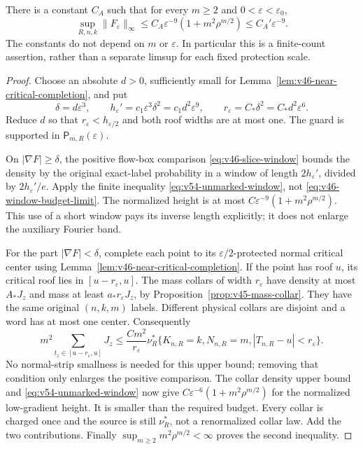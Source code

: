 \begin{proposition}
\label{prop:v54-protected-height}
There is a constant $C_A$ such that for every $m\ge2$ and
$0<\varepsilon<\varepsilon_0$,
\begin{equation}\label{eq:v54-protected-height}
 \sup_{R,n,k}\|F_\varepsilon\|_\infty
 \le C_A\varepsilon^{-9}(1+m^2\rho^{m/2})
 \le C_A'\varepsilon^{-9}.
\end{equation}
The constants do not depend on $m$ or $\varepsilon$. In particular
this is a finite-count assertion, rather than a separate limsup
for each fixed protection scale.
\end{proposition}
\begin{proof}
Choose an absolute $d>0$, sufficiently small for
Lemma~\ref{lem:v46-near-critical-completion}, and put
\[
 \delta=d\varepsilon^3,\qquad
 h_\varepsilon'=c_1\varepsilon^3\delta^2=c_1d^2\varepsilon^9,
 \qquad r_\varepsilon=C_*\delta^2=C_*d^2\varepsilon^6.
\]
Reduce $d$ so that $r_\varepsilon<h_{\varepsilon/2}$ and both roof
widths are at most one. The guard is supported in
$\mathsf P_{m,R}(\varepsilon)$.

On $|\nabla F|\ge\delta$, the positive flow-box comparison
\eqref{eq:v46-slice-window} bounds the density by the original
exact-label probability in a window of length $2h_\varepsilon'$,
divided by $2h_\varepsilon'/e$. Apply the finite inequality
\eqref{eq:v54-unmarked-window}, not
\eqref{eq:v46-window-budget-limit}. The normalized height is at
most $C\varepsilon^{-9}(1+m^2\rho^{m/2})$. This use of a short
window pays its inverse length explicitly; it does not enlarge the
auxiliary Fourier band.

For the part $|\nabla F|<\delta$, complete each point to its
$\varepsilon/2$-protected normal critical center using
Lemma~\ref{lem:v46-near-critical-completion}. If the point has
roof $u$, its critical roof lies in $[u-r_\varepsilon,u]$.
The mass collars of width $r_\varepsilon$ have density at most
$A_*J_z$ and mass at least $a_*r_\varepsilon J_z$, by
Proposition~\ref{prop:v45-mass-collar}. They have the same original
$(n,k,m)$ labels. Different physical collars are disjoint and a word
has at most one center. Consequently
\[
 m^2\sum_{t_z\in[u-r_\varepsilon,u]}J_z
 \le \frac{C m^2}{r_\varepsilon}
 \nu_R^*\{K_{n,R}=k,N_{n,R}=m,
                         |T_{n,R}-u|<r_\varepsilon\}.
\]
No normal-strip smallness is needed for this upper bound; removing
that condition only enlarges the positive comparison. The collar
density upper bound and \eqref{eq:v54-unmarked-window} now give
$C\varepsilon^{-6}(1+m^2\rho^{m/2})$ for the normalized low-gradient
height. It is smaller than the required budget. Every collar is
charged once and the source is still $\nu_R^*$, not a renormalized
collar law. Add the two contributions. Finally
$\sup_{m\ge2}m^2\rho^{m/2}<\infty$ proves the second inequality.
\end{proof}

